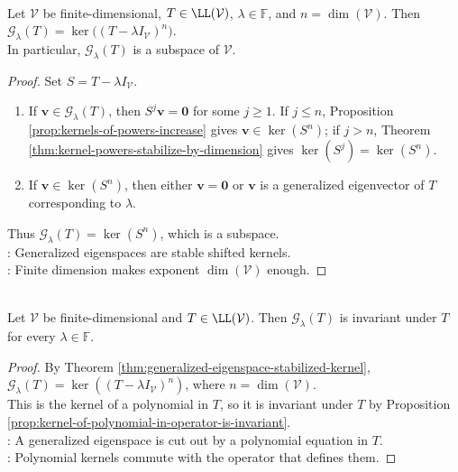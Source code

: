 \begin{theorem} \label{thm:generalized-eigenspace-stabilized-kernel} \\
Let $\mathcal{V}$ be finite-dimensional, $T\in\LL(\mathcal{V})$, $\lambda\in\mathbb{F}$, and $n=\dim(\mathcal{V})$. Then $\mathcal{G}_{\lambda}(T)=\ker\bigl((T-\lambda I_{\mathcal{V}})^n\bigr)$.\\
In particular, $\mathcal{G}_{\lambda}(T)$ is a subspace of $\mathcal{V}$.
\begin{proof}
Set $S=T-\lambda I_{\mathcal{V}}$.
\begin{enumerate}[label=\roman*.]
\setlength{\itemsep}{0pt}
\item[$(\Rightarrow)$] If $\mathbf{v}\in \mathcal{G}_{\lambda}(T)$, then $S^j\mathbf{v}=\mathbf{0}$ for some $j\geq1$. If $j\leq n$, Proposition \ref{prop:kernels-of-powers-increase} gives $\mathbf{v}\in\ker(S^n)$; if $j>n$, Theorem \ref{thm:kernel-powers-stabilize-by-dimension} gives $\ker(S^j)=\ker(S^n)$.
\item[$(\Leftarrow)$] If $\mathbf{v}\in\ker(S^n)$, then either $\mathbf{v}=\mathbf{0}$ or $\mathbf{v}$ is a generalized eigenvector of $T$ corresponding to $\lambda$.
\end{enumerate}
Thus $\mathcal{G}_{\lambda}(T)=\ker(S^n)$, which is a subspace.\\
: Generalized eigenspaces are stable shifted kernels.\\
: Finite dimension makes exponent $\dim(\mathcal{V})$ enough.
\end{proof}
\end{theorem}

\begin{proposition} \label{prop:generalized-eigenspaces-invariant} \\
Let $\mathcal{V}$ be finite-dimensional and $T\in\LL(\mathcal{V})$. Then $\mathcal{G}_{\lambda}(T)$ is invariant under $T$ for every $\lambda\in\mathbb{F}$.
\begin{proof}
By Theorem \ref{thm:generalized-eigenspace-stabilized-kernel}, $\mathcal{G}_{\lambda}(T)=\ker((T-\lambda I_{\mathcal{V}})^n)$, where $n=\dim(\mathcal{V})$.\\
This is the kernel of a polynomial in $T$, so it is invariant under $T$ by Proposition \ref{prop:kernel-of-polynomial-in-operator-is-invariant}.\\
: A generalized eigenspace is cut out by a polynomial equation in $T$.\\
: Polynomial kernels commute with the operator that defines them.
\end{proof}
\end{proposition}

